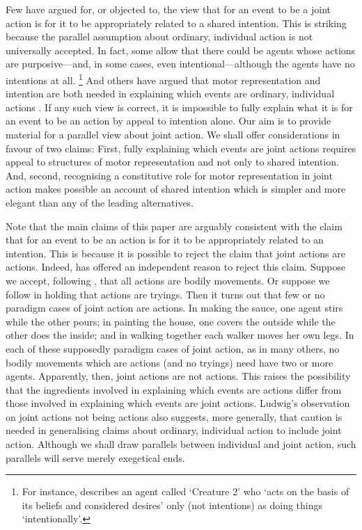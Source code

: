 \documentclass[12pt,\papersize]{extarticle}
\begin{document}
Few have argued for, or objected to, 
the view that for an event to be a joint action is for it to be appropriately related to a shared intention.
This is striking because the parallel assumption about ordinary, individual action is not universally accepted. 
In fact, some allow that there could be agents whose actions are purposive---and, in some cases, even intentional---although  the agents have no intentions at all.%
\footnote{
For instance, \citet[p.\ 251]{bratman:2000_valuing} %
describes an agent called `Creature 2' who `acts on the basis of its beliefs and considered desires' only (not intentions) as doing things `intentionally'.
}
And others have argued that motor representation and intention are both needed in explaining which events are ordinary, individual actions \citep{butterfill:2012_intention}.
If any such view is correct, it is impossible to fully explain what it is for an event to be an action by appeal to intention alone.
Our aim is to provide material for a parallel view about joint action.
We shall offer considerations in favour of two claims: 
First, fully explaining which events are joint actions requires appeal to structures of motor representation and not only to shared intention.
And, second, recognising a constitutive role for motor representation in joint action makes possible an account of shared intention which is simpler and more elegant than any of the leading alternatives.

Note that the main claims of this paper are arguably consistent  with the claim that for an event to be an action is for it to be appropriately related to an intention.
This is because it is possible to reject the claim that joint actions are actions. 
Indeed, \citet[p.\ 376]{ludwig_collective_2007} has offered an independent reason to reject this claim.
Suppose we accept, following \citet[pp.\ 49, 59]{Davidson:1971fz}, that all actions are bodily movements.
Or suppose we follow \citet{hornsby_actions_1980} in holding that actions are tryings. 
Then it turns out that few or no paradigm cases of joint action are actions.
In making the sauce, one agent stirs while the other pours;
in painting the house, one covers the outside while the other does the inside; 
and in walking together each walker moves her own legs.
In each of these supposedly paradigm cases of joint action, as in many others, no bodily movements which are actions (and no tryings) need have two or more agents.
Apparently, then, joint actions are not actions. 
This raises the possibility that the ingredients involved in explaining which events are actions differ from those involved in explaining which events are joint actions.
Ludwig's observation on joint actions not being actions 
also suggests, more generally, that caution is needed in generalising claims about ordinary, individual action to include joint action. 
Although we shall draw parallels between individual and joint action, such parallels will serve merely exegetical ends.
\end{document}
